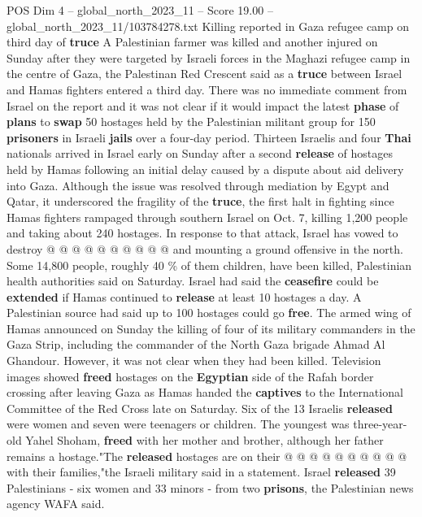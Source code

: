 \begin{textsample}{POS Dim 4 – global\_north\_2023\_11 – Score 19.00 – global\_north\_2023\_11/103784278.txt}  \label{ex:f4_pos_280}
Killing reported in Gaza refugee camp on third day of \textbf{truce} A Palestinian farmer was killed and another injured on Sunday after they were targeted by Israeli forces in the Maghazi refugee camp in the centre of Gaza, the Palestinan Red Crescent said as a \textbf{truce} between Israel and Hamas fighters entered a third day.
There was no immediate comment from Israel on the report and it was not clear if it would impact the latest \textbf{phase} of \textbf{plans} to \textbf{swap} 50 hostages held by the Palestinian militant group for 150 \textbf{prisoners} in Israeli \textbf{jails} over a four-day period.
Thirteen Israelis and four \textbf{Thai} nationals arrived in Israel early on Sunday after a second \textbf{release} of hostages held by Hamas following an initial delay caused by a dispute about aid delivery into Gaza.
Although the issue was resolved through mediation by Egypt and Qatar, it underscored the fragility of the \textbf{truce}, the first halt in fighting since Hamas fighters rampaged through southern Israel on Oct. 7, killing 1,200 people and taking about 240 hostages.
In response to that attack, Israel has vowed to destroy @ @ @ @ @ @ @ @ @ @ and mounting a ground offensive in the north.
Some 14,800 people, roughly 40 \% of them children, have been killed, Palestinian health authorities said on Saturday.
Israel had said the \textbf{ceasefire} could be \textbf{extended} if Hamas continued to \textbf{release} at least 10 hostages a day.
A Palestinian source had said up to 100 hostages could go \textbf{free}.
The armed wing of Hamas announced on Sunday the killing of four of its military commanders in the Gaza Strip, including the commander of the North Gaza brigade Ahmad Al Ghandour.
However, it was not clear when they had been killed.
Television images showed \textbf{freed} hostages on the \textbf{Egyptian} side of the Rafah border crossing after leaving Gaza as Hamas handed the \textbf{captives} to the International Committee of the Red Cross late on Saturday.
Six of the 13 Israelis \textbf{released} were women and seven were teenagers or children.
The youngest was three-year-old Yahel Shoham, \textbf{freed} with her mother and brother, although her father remains a hostage."The \textbf{released} hostages are on their @ @ @ @ @ @ @ @ @ @ with their families,"the Israeli military said in a statement.
Israel \textbf{released} 39 Palestinians - six women and 33 minors - from two \textbf{prisons}, the Palestinian news agency WAFA said.

\end{textsample}
